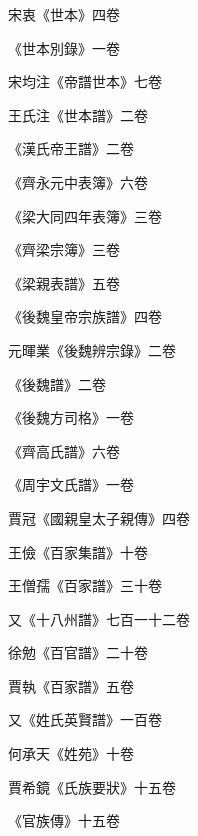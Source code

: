 \begin{pinyinscope}
 宋衷《世本》四卷



 《世本別錄》一卷



 宋均注《帝譜世本》七卷



 王氏注《世本譜》二卷



 《漢氏帝王譜》二卷



 《齊永元中表簿》六卷



 《梁大同四年表簿》三卷



 《齊梁宗簿》三卷



 《梁親表譜》五卷



 《後魏皇帝宗族譜》四卷



 元暉業《後魏辨宗錄》二卷



 《後魏譜》二卷



 《後魏方司格》一卷



 《齊高氏譜》六卷



 《周宇文氏譜》一卷



 賈冠《國親皇太子親傳》四卷



 王儉《百家集譜》十卷



 王僧孺《百家譜》三十卷



 又《十八州譜》七百一十二卷



 徐勉《百官譜》二十卷



 賈執《百家譜》五卷



 又《姓氏英賢譜》一百卷



 何承天《姓苑》十卷



 賈希鏡《氏族要狀》十五卷



 《官族傳》十五卷




\end{pinyinscope}
